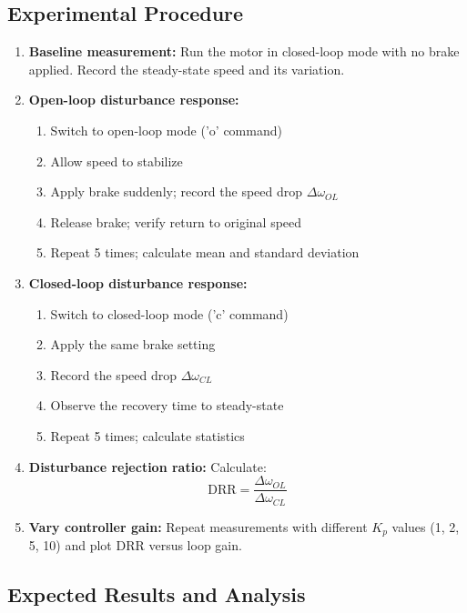 \subsection{Experimental Procedure}

\begin{enumerate}
\item \textbf{Baseline measurement:} Run the motor in closed-loop mode with no brake applied. Record the steady-state speed and its variation.

\item \textbf{Open-loop disturbance response:}
\begin{enumerate}
    \item Switch to open-loop mode ('o' command)
    \item Allow speed to stabilize
    \item Apply brake suddenly; record the speed drop $\Delta\omega_{OL}$
    \item Release brake; verify return to original speed
    \item Repeat 5 times; calculate mean and standard deviation
\end{enumerate}

\item \textbf{Closed-loop disturbance response:}
\begin{enumerate}
    \item Switch to closed-loop mode ('c' command)
    \item Apply the same brake setting
    \item Record the speed drop $\Delta\omega_{CL}$
    \item Observe the recovery time to steady-state
    \item Repeat 5 times; calculate statistics
\end{enumerate}

\item \textbf{Disturbance rejection ratio:} Calculate:
\begin{equation}
\text{DRR} = \frac{\Delta\omega_{OL}}{\Delta\omega_{CL}}
\end{equation}

\item \textbf{Vary controller gain:} Repeat measurements with different $K_p$ values (1, 2, 5, 10) and plot DRR versus loop gain.
\end{enumerate}

\subsection{Expected Results and Analysis}

